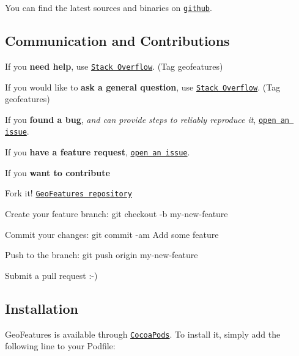 You can find the latest sources and binaries on \href{https://github.com/tonystone/geofeatures}{\tt github}.

\subsection*{Communication and Contributions}


\begin{DoxyItemize}
\item If you {\bfseries need help}, use \href{http://stackoverflow.com/questions/tagged/geofeatures}{\tt Stack Overflow}. (Tag \textquotesingle{}geofeatures\textquotesingle{})
\item If you would like to {\bfseries ask a general question}, use \href{http://stackoverflow.com/questions/tagged/geofeatures}{\tt Stack Overflow}. (Tag \textquotesingle{}geofeatures\textquotesingle{})
\item If you {\bfseries found a bug}, {\itshape and can provide steps to reliably reproduce it}, \href{https://github.com/tonystone/geofeatures/issues}{\tt open an issue}.
\item If you {\bfseries have a feature request}, \href{https://github.com/tonystone/geofeatures/issues}{\tt open an issue}.
\item If you {\bfseries want to contribute}
\begin{DoxyItemize}
\item Fork it! \href{https://github.com/tonystone/geofeatures}{\tt Geo\+Features repository}
\item Create your feature branch\+: {\ttfamily git checkout -\/b my-\/new-\/feature}
\item Commit your changes\+: {\ttfamily git commit -\/am \textquotesingle{}Add some feature\textquotesingle{}}
\item Push to the branch\+: {\ttfamily git push origin my-\/new-\/feature}
\item Submit a pull request \+:-\/)
\end{DoxyItemize}
\end{DoxyItemize}

\subsection*{Installation}

Geo\+Features is available through \href{http://cocoapods.org}{\tt Cocoa\+Pods}. To install it, simply add the following line to your Podfile\+:


